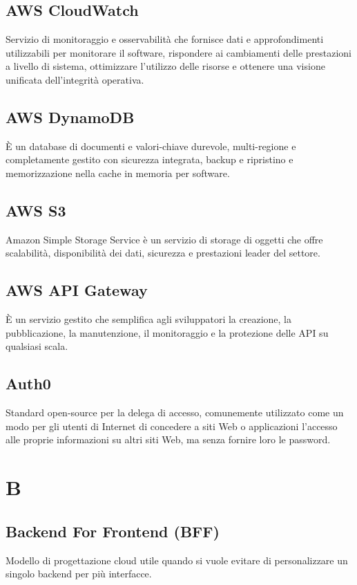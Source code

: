 \subsection*{AWS CloudWatch}
Servizio di monitoraggio e osservabilità che fornisce dati e approfondimenti utilizzabili per monitorare il software, rispondere ai cambiamenti delle prestazioni a livello di sistema, ottimizzare l'utilizzo delle risorse e ottenere una visione unificata dell'integrità operativa.

\subsection*{AWS DynamoDB}
È un database di documenti e valori-chiave durevole, multi-regione e completamente gestito con sicurezza integrata, backup e ripristino e memorizzazione nella cache in memoria per software.

\subsection*{AWS S3}
Amazon Simple Storage Service è un servizio di storage di oggetti che offre scalabilità, disponibilità dei dati, sicurezza e prestazioni leader del settore.

\subsection*{AWS API Gateway}
È un servizio gestito che semplifica agli sviluppatori la creazione, la pubblicazione, la manutenzione, il monitoraggio e la protezione delle API su qualsiasi scala.

\subsection*{Auth0}
Standard open-source per la delega di accesso, comunemente utilizzato come un modo per gli utenti di Internet di concedere a siti Web o applicazioni l'accesso alle proprie informazioni su altri siti Web, ma senza fornire loro le password.

\newpage
\section{B}
\subsection*{Backend For Frontend (BFF)}
Modello di progettazione cloud utile quando si vuole evitare di personalizzare un singolo backend per più interfacce.

